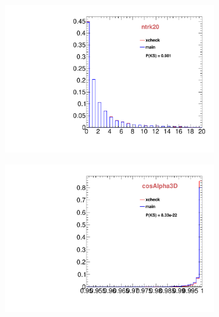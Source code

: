 \begin{figure}
        \centering
        \begin{subfigure}[b]{0.2\textwidth}
                \centering
                \includegraphics[width=\textwidth]{Figures/VariablesComparison/MC_endcaps_figs/closetrk}
                \label{fig:MC_endcaps_closetrk}
        \end{subfigure}
        \begin{subfigure}[b]{0.2\textwidth}
                \centering
                \includegraphics[width=\textwidth]{Figures/VariablesComparison/MC_endcaps_figs/cosa}
                \label{fig:MC_endcaps_cosa}
        \end{subfigure}
        \begin{subfigure}[b]{0.2\textwidth}
                \centering

\end{subfigure}
\end{figure}
